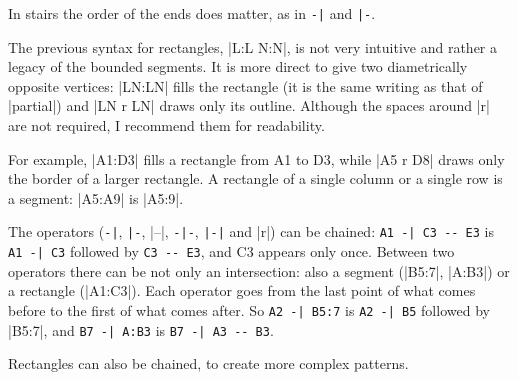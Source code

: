 In stairs the order of the ends does matter, as in \verb+-|+ and \verb+|-+.


The previous syntax for rectangles, |L:L N:N|, is not very intuitive and rather a legacy of the bounded segments. It is more direct to give two diametrically opposite vertices: |LN:LN| fills the rectangle (it is the same writing as that of |partial|) and |LN r LN| draws only its outline. Although the spaces around |r| are not required, I recommend them for readability.

\begin{codeexample}[width=6cm]
	\begin{goban}[label = {at = all}]
	\end{goban}
\end{codeexample}

For example, |A1:D3| fills a rectangle from A1 to D3, while |A5 r D8| draws only the border of a larger rectangle. A rectangle of a single column or a single row is a segment: |A5:A9| is |A5:9|.


The operators (\verb+-|+, \verb+|-+, |--|, \verb+-|-+, \verb+|-|+ and |r|) can be chained: \verb+A1 -| C3 -- E3+ is \verb+A1 -| C3+ followed by \verb+C3 -- E3+, and C3 appears only once. Between two operators there can be not only an intersection: also a segment (|B5:7|, |A:B3|) or a rectangle (|A1:C3|). Each operator goes from the last point of what comes before to the first of what comes after. So \verb+A2 -| B5:7+ is \verb+A2 -| B5+ followed by |B5:7|, and \verb+B7 -| A:B3+ is \verb+B7 -| A3 -- B3+.

\begin{codeexample}[width=6cm]
	\begin{goban}[label = {at = all}]
	\end{goban}
\end{codeexample}

Rectangles can also be chained, to create more complex patterns.

\begin{codeexample}[width=6cm]
	\begin{goban}[label = {at = all}]
	\end{goban}
\end{codeexample}

